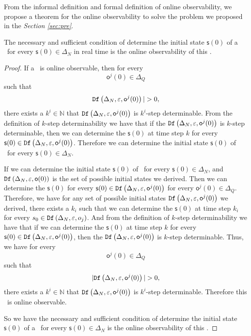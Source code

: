 From the informal definition and formal definition of online observability, we propose a theorem for the online observability to solve the problem we proposed in the {\em Section \ref{sec:pre}}.
\begin{theorem}
The necessary and sufficient condition of determine the initial state $\mathsf{s}(0)$ of a \BCN\ for every $\mathsf{s}(0)\in \Delta_N$ in real time is the online observability of this \BCN. 
\label{theo:1}
\end{theorem}
\begin{proof}
 If a \BCN\ is online observable,
then for every  \[\mathsf{o}^{j}(0)\in \Delta_Q\] such that \[\Ded\left(\Delta_N,\varepsilon, \mathsf{o}^{j}(0)\right)|> 0,\] there exists a $k^{i}\in \mathbb{N}$ that ${\tt Df}\left(\Delta_N,\varepsilon,\mathsf{o}^{j}(0)\right)$ is $k^{i}$-step determinable. From the definition of $k$-step determinability we have that if the ${\tt Df}\left(\Delta_N,\varepsilon,\mathsf{o}^{j}(0)\right)$ is $k$-step determinable, then we can determine the $\mathsf{s}(0)$ at time step $k$ for every $\mathsf{s}(0) \in {\tt Df}\left(\Delta_N,\varepsilon,\mathsf{o}^{j}(0)\right)$. Therefore we can determine the initial state $\mathsf{s}(0)$ of \BCNs\ for every $\mathsf{s}(0)\in \Delta_N$.

If we can determine the initial state $\mathsf{s}(0)$ of \BCNs\ for every $\mathsf{s}(0)\in \Delta_N$, and ${\tt Df}\left(\Delta_N,\varepsilon,\mathsf{o}(0)\right)$ is the set of possible initial states we derived. Then we can determine the $\mathsf{s}(0)$ for every $\mathsf{s}(0) \in {\tt Df}\left(\Delta_N,\varepsilon,\mathsf{o}^{j}(0)\right)$ for every $\mathsf{o}^{j}(0)\in \Delta_Q$. Therefore, we have for any set of possible initial states ${\tt Df}\left(\Delta_N,\varepsilon, \mathsf{o}^{j}(0)\right)$ we derived, there exists a $k_i$ such that we can determine the $\mathsf{s}(0)$ at time step $k_i$ for every $s_0\in {\tt Df}\left(\Delta_N,\varepsilon,o_j\right)$. And from the definition of $k$-step determinability we have that if we can determine the $\mathsf{s}(0)$ at time step $k$ for every $\mathsf{s}(0) \in {\tt Df}\left(\Delta_N,\varepsilon,\mathsf{o}^{j}(0)\right)$, then the ${\tt Df}\left(\Delta_N,\varepsilon,\mathsf{o}^{j}(0)\right)$ is $k$-step determinable.
 Thus, we have for every  \[\mathsf{o}^{j}(0)\in \Delta_Q\] such that \[|\Ded\left(\Delta_N,\varepsilon, \mathsf{o}^{j}(0)\right)|> 0,\] there exists a $k^{i}\in \mathbb{N}$ that ${\tt Df}\left(\Delta_N,\varepsilon,\mathsf{o}^{j}(0)\right)$ is $k^{i}$-step determinable. Therefore this \BCN\ is online observable.

So we have the necessary and sufficient condition of determine the initial state $\mathsf{s}(0)$ of a \BCN\ for every $\mathsf{s}(0)\in \Delta_N$ is the online observability of this \BCN. 
\end{proof}

